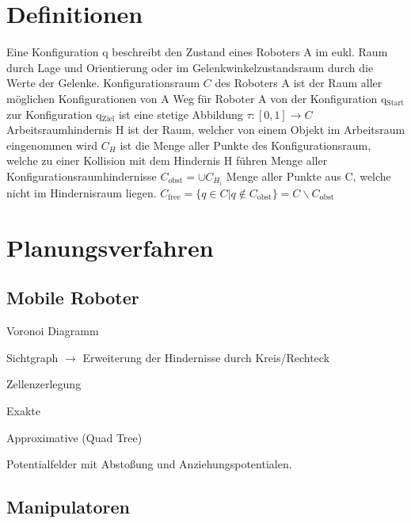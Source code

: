 \section{Definitionen}
Eine Konfiguration q beschreibt den Zustand eines Roboters A im eukl. Raum durch Lage und Orientierung
oder im Gelenkwinkelzustandsraum durch die Werte der Gelenke.
Konfigurationsraum $C$ des Roboters A ist der Raum aller möglichen Konfigurationen von A
Weg für Roboter A von der Konfiguration q$_\text{Start}$ zur Konfiguration q$_\text{Ziel}$ ist eine
stetige Abbildung $\tau:[0,1] \rightarrow C$
Arbeitsraumhindernis H ist der Raum, welcher von einem Objekt im Arbeitsraum eingenommen wird
$C_H$ ist die Menge aller Punkte des Konfigurationsraum, welche zu einer Kollision mit dem Hindernis
H führen
Menge aller Konfigurationsraumhindernisse $C_\text{obst} = \cup C_{H_i}$
Menge aller Punkte aus C, welche nicht im Hindernisraum liegen.
$C_\text{free} =  \{ q \in C | q \notin C_\text{obst}\} = C \backslash C_\text{obst}$

\section{Planungsverfahren}
\subsection{Mobile Roboter}
\begin{compactitem}
    \item Voronoi Diagramm
    \item Sichtgraph $\rightarrow$ Erweiterung der Hindernisse durch Kreis/Rechteck
    \item Zellenzerlegung
    \begin{compactitem}
        \item Exakte
        \item Approximative (Quad Tree)
    \end{compactitem}
    \item Potentialfelder mit Abstoßung und Anziehungspotentialen.
\end{compactitem}
\subsection{Manipulatoren}
